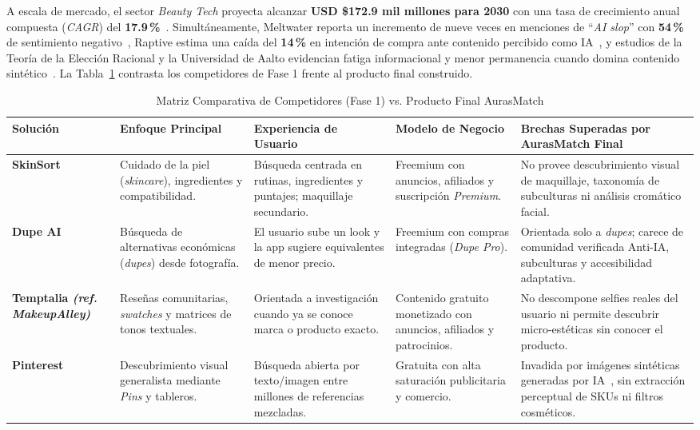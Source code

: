 \documentclass[conference]{IEEEtran}
\begin{document}
A escala de mercado, el sector \textit{Beauty Tech} proyecta alcanzar \textbf{USD \$172.9 mil millones para 2030} con una tasa de crecimiento anual compuesta (\textit{CAGR}) del \textbf{17.9\,\%}~\cite{ref1,ref2}. Simultáneamente, Meltwater reporta un incremento de nueve veces en menciones de ``\textit{AI slop}'' con \textbf{54\,\%} de sentimiento negativo~\cite{ref4}, Raptive estima una caída del \textbf{14\,\%} en intención de compra ante contenido percibido como IA~\cite{ref4}, y estudios de la Teoría de la Elección Racional y la Universidad de Aalto evidencian fatiga informacional y menor permanencia cuando domina contenido sintético~\cite{ref5,ref6,ref7}. La Tabla~\ref{tab:competidores} contrasta los competidores de Fase 1 frente al producto final construido.

\begin{table}[t]
\centering
\caption{Matriz Comparativa de Competidores (Fase 1) vs. Producto Final AurasMatch}
\label{tab:competidores}
\renewcommand{\arraystretch}{1.22}
\begin{tabularx}{\textwidth}{>{\bfseries}p{2.3cm} p{3.1cm} p{3.1cm} p{2.8cm} X}
\toprule
Solución & Enfoque Principal & Experiencia de Usuario & Modelo de Negocio & Brechas Superadas por AurasMatch Final \\
\midrule
SkinSort & Cuidado de la piel (\textit{skincare}), ingredientes y compatibilidad. & Búsqueda centrada en rutinas, ingredientes y puntajes; maquillaje secundario. & Freemium con anuncios, afiliados y suscripción \textit{Premium}. & No provee descubrimiento visual de maquillaje, taxonomía de subculturas ni análisis cromático facial. \\
Dupe AI & Búsqueda de alternativas económicas (\textit{dupes}) desde fotografía. & El usuario sube un look y la app sugiere equivalentes de menor precio. & Freemium con compras integradas (\textit{Dupe Pro}). & Orientada solo a \textit{dupes}; carece de comunidad verificada Anti-IA, subculturas y accesibilidad adaptativa. \\
Temptalia \newline \textit{(ref. MakeupAlley)} & Reseñas comunitarias, \textit{swatches} y matrices de tonos textuales. & Orientada a investigación cuando ya se conoce marca o producto exacto. & Contenido gratuito monetizado con anuncios, afiliados y patrocinios. & No descompone selfies reales del usuario ni permite descubrir micro-estéticas sin conocer el producto. \\
Pinterest & Descubrimiento visual generalista mediante \textit{Pins} y tableros. & Búsqueda abierta por texto/imagen entre millones de referencias mezcladas. & Gratuita con alta saturación publicitaria y comercio. & Invadida por imágenes sintéticas generadas por IA~\cite{ref8}, sin extracción perceptual de SKUs ni filtros cosméticos. \\

\end{tabularx}
\end{table}
\end{document}
